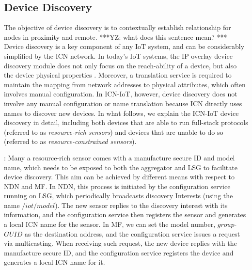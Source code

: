 \subsection{Device Discovery}
The objective of device discovery is to contextually establish relationship for nodes in proximity and remote. ***YZ: what does this sentence mean? *** Device discovery is a key component of any IoT system, and can be considerably simplified by the ICN network. In today's IoT systems, the IP overlay device discovery module does not only focus on the reach-ability of a device, but also the device physical properties \cite{iotivity,alljoyn}. Moreover, a translation service is required to maintain the mapping from network addresses to physical attributes, which often involves manual configuration. In ICN-IoT, however, device discovery does not involve any manual configuration or name translation because ICN directly uses names to discover new devices. In what follows, we explain the ICN-IoT device discovery  in detail, including both devices that are able to run  full-stack protocols (referred to as \emph{resource-rich sensors}) and devices that are unable to do so (referred to as \emph{resource-constrained sensors}).

\vspace{1mm}: Many a resource-rich sensor comes with a manufacture secure ID and model name, which needs to be exposed to both the aggregator and LSG to facilitate device discovery. This aim can be achieved by different means with respect to NDN and MF.  In NDN, this process is initiated by the configuration service running on LSG, which periodically broadcasts discovery Interests (using the name $/iot/model$). The new sensor replies to the discovery interest with its information, and the configuration service then registers the sensor and generates a local ICN name for the sensor. In MF, we can set the model number, $group$-$GUID$ as the destination address, and the configuration service issues a request via multicasting. When receiving such request, the new device replies with the manufacture secure ID, and the configuration service registers the device and  generates a local ICN name for it.


